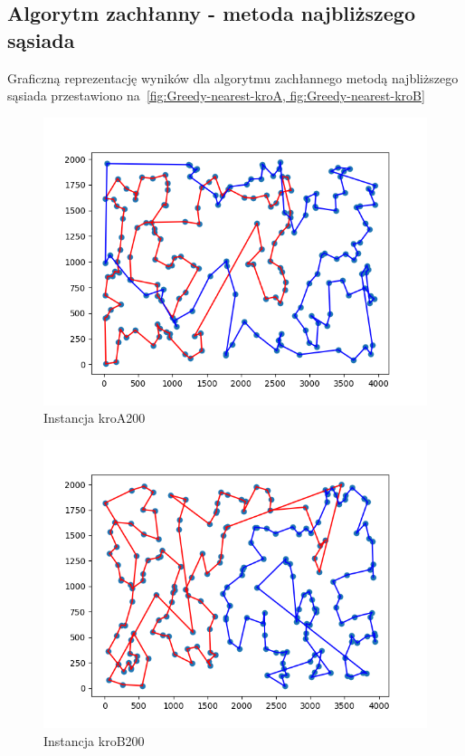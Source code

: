 \documentclass[11pt]{article}
\begin{document}
\subsection{Algorytm zachłanny - metoda najbliższego sąsiada}\label{subsec:algorytm-zachanny---metoda-najblizszego-sasiada2}

Graficzną reprezentację wyników dla algorytmu zachłannego metodą najbliższego sąsiada przestawiono na~\ref{fig:Greedy-nearest-kroA, fig:Greedy-nearest-kroB}
\begin{figure}[H]
    \centering
    \includegraphics{best_paths/greedy_nearest_neighbor_kroA200.tsp}
    \caption{Instancja kroA200}
    \label{fig:Greedy-nearest-kroA}
\end{figure}
\begin{figure}[H]
    \centering
    \includegraphics{best_paths/greedy_nearest_neighbor_kroB200.tsp}
    \caption{Instancja kroB200}
    \label{fig:Greedy-nearest-kroB}
\end{figure}
\end{document}
